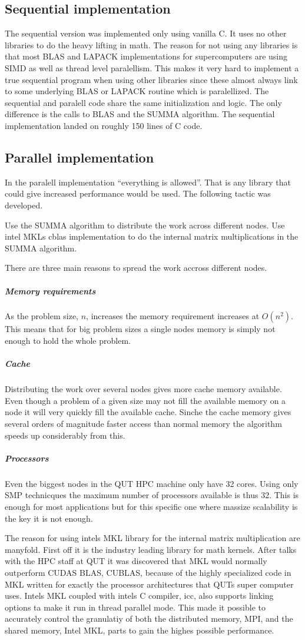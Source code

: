 \documentclass{article}
\begin{document}
\subsection{Sequential implementation}
The sequential version was implemented only using vanilla C. It uses no other libraries to
do the heavy lifting in math. The reason for not using any libraries is that most BLAS and LAPACK
implementations for supercomputers are using SIMD as well as thread level paralellism. This makes
it very hard to implement a true sequential program when using other libraries since these almost always
link to some underlying BLAS or LAPACK routine which is paralellized. The sequential and paralell code
share the same initialization and logic. The only difference is the calls to BLAS and the SUMMA algorithm.
The sequential implementation landed on roughly 150 lines of C code.

\subsection{Parallel implementation}
In the paralell implementation ``everything is allowed''. That is any library that could give
increased performance would be used. The following tactic was developed.

Use the SUMMA algorithm to distribute the work across different nodes. Use intel MKLs cblas implementation
to do the internal matrix multiplications in the SUMMA algorithm.

There are three main reasons to spread the work accross different nodes.
\subparagraph{Memory requirements}
As the problem size, $n$, increases the memory requirement increases at $O(n^2)$. This means that for
big problem sizes a single nodes memory is simply not enough to hold the whole problem.
\subparagraph{Cache}
Distributing the work over several nodes gives more cache memory available. Even though a problem
of a given size may not fill the available memory on a node it will very quickly fill the available
cache. Sinche the cache memory gives several orders of magnitude faster access than normal memory
the algorithm speeds up considerably from this.
\subparagraph{Processors}
Even the biggest nodes in the QUT HPC machine only have 32 cores. Using only SMP technicques
the maximum number of processors available is thus 32. This is enough for most applications but
for this specific one where massize scalability is the key it is not enough.

The reason for using intels MKL library for the internal matrix multiplication are manyfold. First
off it is the industry leading library for math kernels. After talks with the HPC staff at QUT it was
discovered that MKL would normally outperform CUDAS BLAS, CUBLAS, because of the highly specialized code
in MKL written for exactly the processor architectures that QUTs super computer uses. Intels MKL coupled
with intels C compiler, icc, also supports linking options ta make it run in thread parallel mode. This
made it possible to accurately control the granulatiy of both the distributed memory, MPI, and the
shared memory, Intel MKL, parts to gain the highes possible performance.
\end{document}
